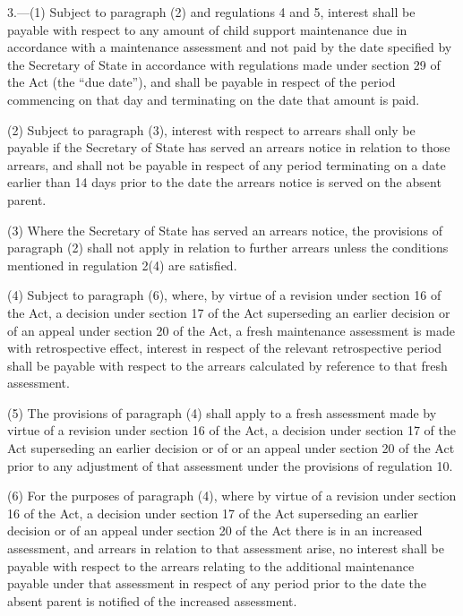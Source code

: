 \documentclass[12pt,a4paper]{article}
\begin{document}
3.—(1) Subject to paragraph (2) and regulations 4 and 5, interest shall be payable with respect to any amount of child support maintenance due in accordance with a maintenance assessment and not paid by the date specified by the Secretary of State in accordance with regulations made under section 29 of the Act (the “due date”), and shall be payable in respect of the period commencing on that day and terminating on the date that amount is paid.

(2) Subject to paragraph (3), interest with respect to arrears shall only be payable if the Secretary of State has served an arrears notice in relation to those arrears, and shall not be payable in respect of any period terminating on a date earlier than 14 days prior to the date the arrears notice is served on the absent parent.

(3) Where the Secretary of State has served an arrears notice, the provisions of paragraph (2) shall not apply in relation to further arrears unless the conditions mentioned in regulation 2(4) are satisfied.

(4) Subject to paragraph (6), where, 
by virtue of a revision under section 16 of the Act, a decision under section 17 of the Act superseding an earlier decision or of  %
an appeal under section 20 of the Act, a fresh maintenance assessment is made with retrospective effect, interest in respect of the relevant retrospective period shall be payable with respect to the arrears calculated by reference to that fresh assessment.

(5) The provisions of paragraph (4) shall apply to a fresh assessment 
made by virtue of a revision under section 16 of the Act, a decision under section 17 of the Act superseding an earlier decision or of  %
or an appeal under section 20 of the Act prior to any adjustment of that assessment under the provisions of regulation 10.

(6) For the purposes of paragraph (4), where 
by virtue of a revision under section 16 of the Act, a decision under section 17 of the Act superseding an earlier decision or of an appeal under section 20 of the Act there is  %
in an increased assessment, and arrears in relation to that assessment arise, no interest shall be payable with respect to the arrears relating to the additional maintenance payable under that assessment in respect of any period prior to the date the absent parent is notified of the increased assessment.
\end{document}
